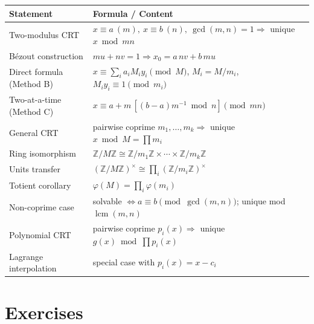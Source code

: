\documentclass[11pt]{article}
\theoremstyle{definition}
\theoremstyle{remark}
\newcommand{\Z}{\mathbb{Z}}
\DeclareMathOperator{\lcmop}{lcm}
\begin{document}
\begin{center}
\renewcommand{\arraystretch}{1.6}
\begin{tabular}{p{6.4cm}p{7.8cm}}
\toprule
\textbf{Statement} & \textbf{Formula / Content} \\
\midrule
Two-modulus CRT & $x\equiv a\ (m),\ x\equiv b\ (n),\ \gcd(m,n)=1 \Rightarrow$ unique $x \bmod mn$ \\
Bézout construction & $mu+nv=1 \Rightarrow x_0 = a\,nv + b\,mu$ \\
Direct formula (Method B) & $x\equiv\sum_i a_iM_iy_i \pmod M$, $M_i=M/m_i$, $M_iy_i\equiv1\pmod{m_i}$ \\
Two-at-a-time (Method C) & $x\equiv a+m\,[(b-a)m^{-1}\bmod n] \pmod{mn}$ \\
General CRT & pairwise coprime $m_1,\dots,m_k \Rightarrow$ unique $x \bmod M=\prod m_i$ \\
Ring isomorphism & $\Z/M\Z \cong \Z/m_1\Z\times\cdots\times\Z/m_k\Z$ \\
Units transfer & $(\Z/M\Z)^\times \cong \prod_i (\Z/m_i\Z)^\times$ \\
Totient corollary & $\varphi(M) = \prod_i \varphi(m_i)$ \\
Non-coprime case & solvable $\iff a\equiv b \pmod{\gcd(m,n)}$; unique mod $\lcmop(m,n)$ \\
Polynomial CRT & pairwise coprime $p_i(x) \Rightarrow$ unique $g(x) \bmod \prod p_i(x)$ \\
Lagrange interpolation & special case with $p_i(x)=x-c_i$ \\
\bottomrule
\end{tabular}
\end{center}

\section{Exercises}
\end{document}
